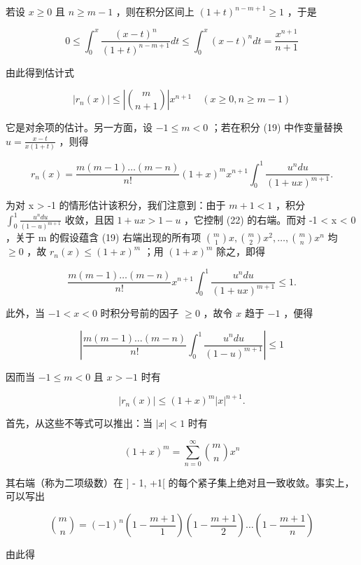 若设 \(x \geqslant 0\) 且 \(n \geqslant m - 1\) ，则在积分区间上 \((1 + t)^{n - m + 1} \geqslant 1\) ，于是

\[
0 \leqslant \int_ {0} ^ {x} \frac {(x - t) ^ {n}}{(1 + t) ^ {n - m + 1}} d t \leqslant \int_ {0} ^ {x} (x - t) ^ {n} d t = \frac {x ^ {n + 1}}{n + 1}
\]

由此得到估计式

\[
\left| r _ {n} (x) \right| \leqslant \left| \binom {m} {n + 1} \right| x ^ {n + 1} \quad (x \geqslant 0, n \geqslant m - 1)\tag{21}
\]

它是对余项的估计。另一方面，设 \(-1 \leqslant m < 0\) ；若在积分 (19) 中作变量替换 \(u = \frac{x - t}{x(1 + t)}\) ，则得

\[
r _ {n} (x) = \frac {m (m - 1) \dots (m - n)}{n !} (1 + x) ^ {m} x ^ {n + 1} \int_ {0} ^ {1} \frac {u ^ {n} d u}{(1 + u x) ^ {m + 1}}.\tag{22}
\]

为对 x \textgreater{} -1 的情形估计该积分，我们注意到：由于 \(m + 1 < 1\) ，积分 \(\int_{0}^{1}\frac{u^{n}du}{(1-u)^{m+1}}\) 收敛，且因 \(1+ux > 1-u\) ，它控制 (22) 的右端。而对 -1 \textless{} x \textless{} 0 ，关于 m 的假设蕴含 (19) 右端出现的所有项 \(\binom{m}{1}x,\binom{m}{2}x^{2},\ldots,\binom{m}{n}x^{n}\) 均 \(\geqslant 0\) ，故 \(r_{n}(x) \leqslant (1+x)^{m}\) ；用 \((1+x)^{m}\) 除之，即得

\[
\frac {m (m - 1) \dots (m - n)}{n !} x ^ {n + 1} \int_ {0} ^ {1} \frac {u ^ {n} d u}{(1 + u x) ^ {m + 1}} \leqslant 1.
\]

此外，当 \(-1 < x < 0\) 时积分号前的因子 \(\geqslant 0\) ，故令 \(x\) 趋于 \(-1\) ，便得

\[
\left| \frac {m (m - 1) \dots (m - n)}{n !} \int_ {0} ^ {1} \frac {u ^ {n} d u}{(1 - u) ^ {m + 1}} \right| \leqslant 1
\]

因而当 \(-1 \leqslant m < 0\) 且 \(x > -1\) 时有

\[
\left| r _ {n} (x) \right| \leqslant (1 + x) ^ {m} | x | ^ {n + 1}.\tag{23}
\]

首先，从这些不等式可以推出：当 \(|x| < 1\) 时有

\[
(1 + x) ^ {m} = \sum_ {n = 0} ^ {\infty} \binom {m} {n} x ^ {n}\tag{24}
\]

其右端（称为二项级数）在 {]} - 1, +1{[} 的每个紧子集上绝对且一致收敛。事实上，可以写出

\[
\binom {m} {n} = (- 1) ^ {n} \left(1 - \frac {m + 1}{1}\right) \left(1 - \frac {m + 1}{2}\right) \dots \left(1 - \frac {m + 1}{n}\right)\tag{25}
\]

由此得

